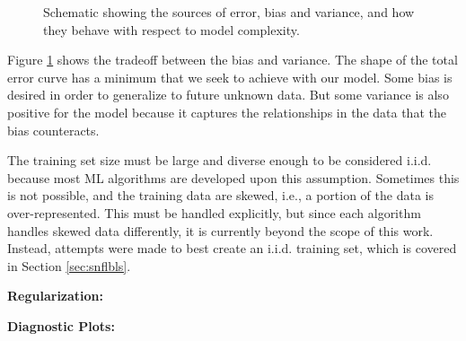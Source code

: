\begin{figure}[!htb]
  \caption{Schematic showing the sources of error, bias and variance, and how 
           they behave with respect to model complexity.}
  \label{fig:bvtradeoff}
\end{figure}

Figure \ref{fig:bvtradeoff} shows the tradeoff between the bias and variance.
The shape of the total error curve has a minimum that we seek to achieve with
our model. Some bias is desired in order to generalize to future unknown data.
But some variance is also positive for the model because it captures the
relationships in the data that the bias counteracts. 

The training set size must be large and diverse enough to be considered
\gls{i.i.d.} because most \gls{ML} algorithms are developed upon this
assumption. Sometimes this is not possible, and the training data are skewed,
i.e., a portion of the data is over-represented. This must be handled
explicitly, but since each algorithm handles skewed data differently, it is
currently beyond the scope of this work. Instead, attempts were made to best
create an \gls{i.i.d.} training set, which is covered in Section
\ref{sec:snflbls}.

\noindent \textbf{Regularization:}


\noindent \textbf{Diagnostic Plots:} 

